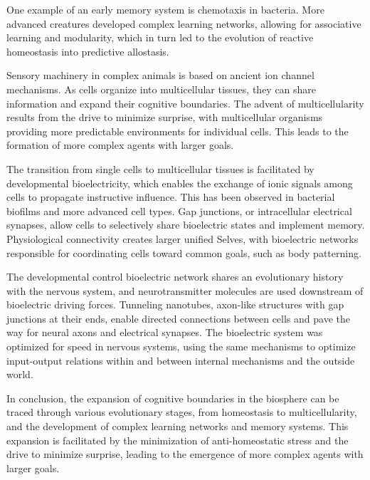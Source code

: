 One example of an early memory system is chemotaxis in bacteria. More advanced creatures developed complex learning networks, allowing for associative learning and modularity, which in turn led to the evolution of reactive homeostasis into predictive allostasis.

Sensory machinery in complex animals is based on ancient ion channel mechanisms. As cells organize into multicellular tissues, they can share information and expand their cognitive boundaries. The advent of multicellularity results from the drive to minimize surprise, with multicellular organisms providing more predictable environments for individual cells. This leads to the formation of more complex agents with larger goals.

The transition from single cells to multicellular tissues is facilitated by developmental bioelectricity, which enables the exchange of ionic signals among cells to propagate instructive influence. This has been observed in bacterial biofilms and more advanced cell types. Gap junctions, or intracellular electrical synapses, allow cells to selectively share bioelectric states and implement memory. Physiological connectivity creates larger unified Selves, with bioelectric networks responsible for coordinating cells toward common goals, such as body patterning.

The developmental control bioelectric network shares an evolutionary history with the nervous system, and neurotransmitter molecules are used downstream of bioelectric driving forces. Tunneling nanotubes, axon-like structures with gap junctions at their ends, enable directed connections between cells and pave the way for neural axons and electrical synapses. The bioelectric system was optimized for speed in nervous systems, using the same mechanisms to optimize input-output relations within and between internal mechanisms and the outside world.

In conclusion, the expansion of cognitive boundaries in the biosphere can be traced through various evolutionary stages, from homeostasis to multicellularity, and the development of complex learning networks and memory systems. This expansion is facilitated by the minimization of anti-homeostatic stress and the drive to minimize surprise, leading to the emergence of more complex agents with larger goals.





















